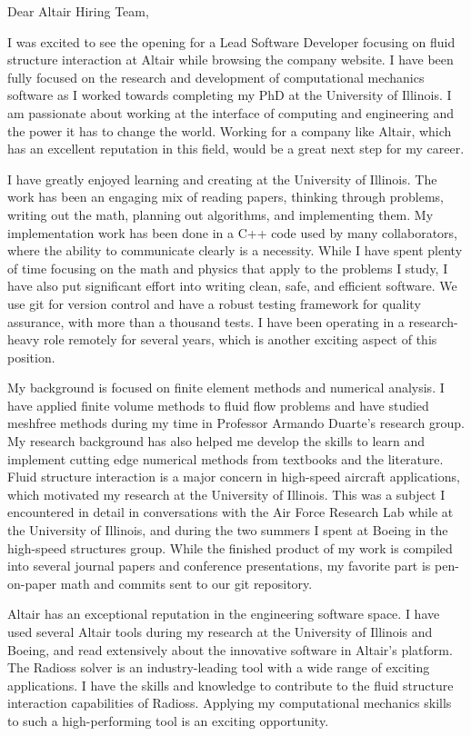 \documentclass{resume}
\begin{document}
\vspace{0.5in}
Dear Altair Hiring Team,

I was excited to see the opening for a Lead Software Developer 
focusing on fluid structure interaction at
Altair while browsing the company website.
%
I have been fully focused on the research and development of
computational mechanics software as I worked towards
completing my PhD at the University of Illinois.
%
I am passionate about working at the interface
of computing and engineering and the power it has to change the world.
%
Working for a company like Altair, which has an excellent reputation
in this field, would be a great next step for my career.
%

I have greatly enjoyed learning and creating at the University
of Illinois.
%
The work has been an engaging mix of reading papers, thinking through
problems, writing out the math, planning out algorithms, and
implementing them.
%
My implementation work has been done in a C++ code
used by many collaborators, where the ability to communicate
clearly is a necessity. 
%
While I have spent plenty of time focusing on the math and physics
that apply to the problems I study, I have also put significant effort
into writing clean, safe, and efficient software.
%
We use git for version control and have a robust testing
framework for quality assurance, with more than a thousand tests.
%
I have been operating in a research-heavy role remotely for
several years, which is another exciting aspect of this position.
%

My background is focused on finite element methods and numerical analysis.
%
I have applied finite volume methods to fluid flow problems and have
studied meshfree methods during my time in Professor
Armando Duarte's research group.
%
My research background has also helped me develop the skills to learn
and implement cutting edge numerical methods from textbooks and
the literature.
%
Fluid structure interaction is a major concern in high-speed
aircraft applications, which motivated my research at the University
of Illinois.
%
This was a subject I encountered in detail in conversations with the
Air Force Research Lab while at the University of Illinois, and during
the two summers I spent at Boeing in the high-speed structures group.
%
While the finished product of my work is compiled into several journal
papers and conference presentations, my favorite part is pen-on-paper math
and commits sent to our git repository.
%

Altair has an exceptional reputation in the engineering software
space.
%
I have used several Altair tools during my research at the University
of Illinois and Boeing, and read extensively about the
innovative software in Altair's platform.
%
The Radioss solver is an industry-leading tool with a wide range of
exciting applications.
%
I have the skills and knowledge to contribute to the fluid structure
interaction capabilities of Radioss.
%
Applying my computational mechanics skills to such a high-performing tool
is an exciting opportunity.
%
\end{document}
